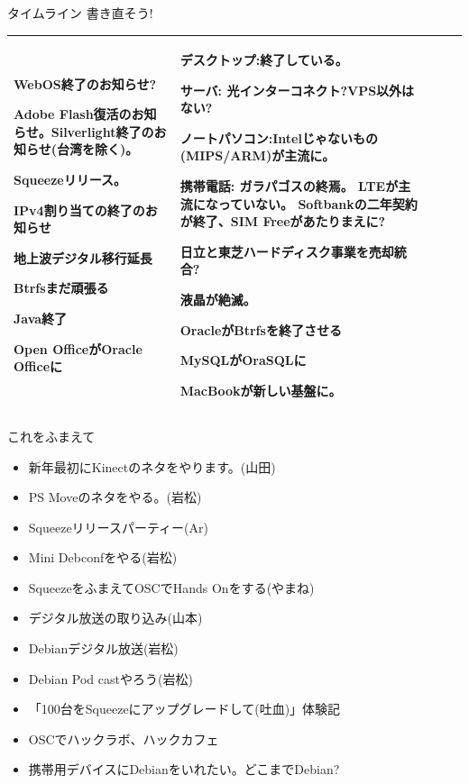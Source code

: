 \begin{frame}{タイムライン 書き直そう!}
{\begin{tabular}[t]{|p{4em}|p{4em}|p{9em}|p{7em}|p{6em}|}
WebOS終了のお知らせ?

Adobe Flash復活のお知らせ。Silverlight終了のお知らせ(台湾を除く)。

Squeezeリリース。

IPv4割り当ての終了のお知らせ

地上波デジタル移行延長

Btrfsまだ頑張る

Java終了

Open OfficeがOracle Officeに

&

デスクトップ:終了している。

サーバ:
光インターコネクト?VPS以外はない?

ノートパソコン:Intelじゃないもの(MIPS/ARM)が主流に。

携帯電話:
ガラパゴスの終焉。
LTEが主流になっていない。
Softbankの二年契約が終了、SIM Freeがあたりまえに?

日立と東芝ハードディスク事業を売却統合?

液晶が絶滅。

OracleがBtrfsを終了させる

MySQLがOraSQLに


MacBookが新しい基盤に。

\\

\hline
\end{tabular}

}
\end{frame}

\begin{frame}{これをふまえて}
\begin{itemize}
 \item 新年最初にKinectのネタをやります。(山田)
 \item PS Moveのネタをやる。(岩松)
 \item Squeezeリリースパーティー(Ar)
 \item Mini Debconfをやる(岩松)
 \item SqueezeをふまえてOSCでHands Onをする(やまね)
 \item デジタル放送の取り込み(山本)
 \item Debianデジタル放送(岩松)
 \item Debian Pod castやろう(岩松)
 \item 「100台をSqueezeにアップグレードして(吐血)」体験記
 \item OSCでハックラボ、ハックカフェ
 \item 携帯用デバイスにDebianをいれたい。どこまでDebian?
\end{itemize}
\end{frame}

